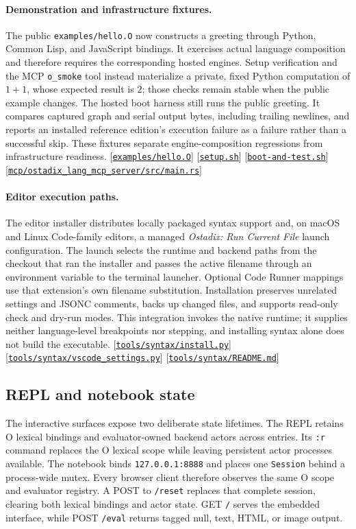 \documentclass[11pt,oneside]{article}
\newcommand{\src}[1]{\textcolor{OSlate}{\scriptsize[\href{https://github.com/lostadi/OSTADIX/blob/c0b02c326b2329a95ba52447c7180bc93957cd57/#1}{\nolinkurl{#1}}]}\allowbreak}
\begin{document}
\paragraph{Demonstration and infrastructure fixtures.}
The public \texttt{examples/hello.O} now constructs a greeting through
Python, Common Lisp, and JavaScript bindings. It exercises actual language
composition and therefore requires the corresponding hosted engines. Setup
verification and the MCP \texttt{o\_smoke} tool instead materialize a private,
fixed Python computation of $1+1$, whose expected result is $2$; those checks
remain stable when the public example changes. The hosted boot harness still
runs the public greeting. It compares captured graph and serial output bytes,
including trailing newlines, and reports an installed reference edition's
execution failure as a failure rather than a successful skip. These fixtures
separate engine-composition regressions from infrastructure readiness.
\src{examples/hello.O}
\src{setup.sh}
\src{boot-and-test.sh}
\src{mcp/ostadix_lang_mcp_server/src/main.rs}

\paragraph{Editor execution paths.}
The editor installer distributes locally packaged syntax support and, on
macOS and Linux Code-family editors, a managed \emph{Ostadix: Run Current
File} launch configuration. The launch selects the runtime and backend paths
from the checkout that ran the installer and passes the active filename
through an environment variable to the terminal launcher. Optional Code
Runner mappings use that extension's own filename substitution. Installation
preserves unrelated settings and JSONC comments, backs up changed files, and
supports read-only check and dry-run modes. This integration invokes the
native runtime; it supplies neither language-level breakpoints nor stepping,
and installing syntax alone does not build the executable.
\src{tools/syntax/install.py}
\src{tools/syntax/vscode_settings.py}
\src{tools/syntax/README.md}

\subsection{REPL and notebook state}

The interactive surfaces expose two deliberate state lifetimes. The REPL
retains O lexical bindings and evaluator-owned backend actors across entries.
Its \texttt{:r} command replaces the O lexical scope while leaving persistent
actor processes available. The notebook binds \texttt{127.0.0.1:8888} and
places one \texttt{Session} behind a process-wide mutex. Every browser client
therefore observes the same O scope and evaluator registry. A POST to
\texttt{/reset} replaces that complete session, clearing both lexical bindings
and actor state. GET \texttt{/} serves the embedded interface, while POST
\texttt{/eval} returns tagged null, text, HTML, or image output.
\end{document}
